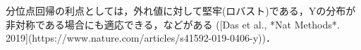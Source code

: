 分位点回帰の利点としては，外れ値に対して堅牢(ロバスト)である，Yの分布が非対称である場合にも適応できる，などがある ([Das et al., *Nat Methods*. 2019](https://www.nature.com/articles/s41592-019-0406-y))．